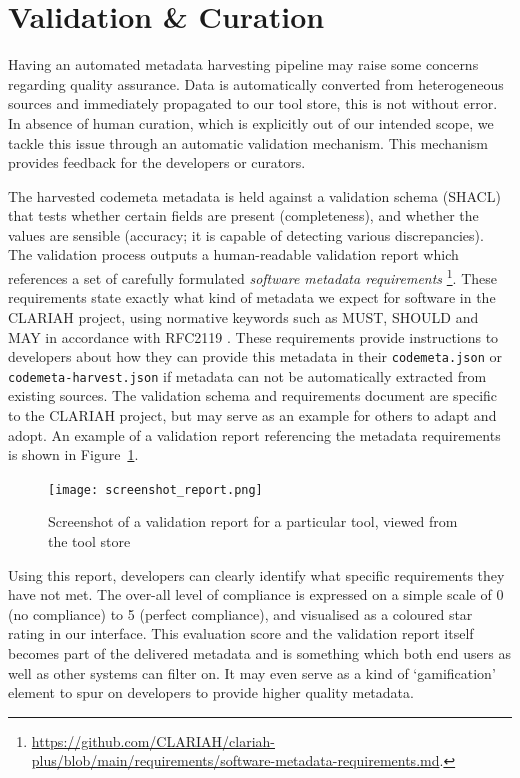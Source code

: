 \documentclass[a4paper,11pt]{article}
\begin{document}

\section{Validation \& Curation}

Having an automated metadata harvesting pipeline may raise some concerns
regarding quality assurance. Data is automatically converted from heterogeneous
sources and immediately propagated to our tool store, this is not without
error. In absence of human curation, which is explicitly out of our intended
scope, we tackle this issue through an automatic validation mechanism. This mechanism provides
feedback for the developers or curators.

The harvested codemeta metadata is held against a validation schema (SHACL)
that tests whether certain fields are present (completeness), and whether the
values are sensible (accuracy; it is capable of detecting various
discrepancies). The validation process outputs a human-readable validation
report which references a set of carefully formulated \emph{software metadata
requirements}
\footnote{\url{https://github.com/CLARIAH/clariah-plus/blob/main/requirements/software-metadata-requirements.md}.}.
These requirements state exactly what kind of metadata we expect for software
in the CLARIAH project, using normative keywords such as \textsc{MUST}, \textsc{SHOULD} and \textsc{MAY}
in accordance with RFC2119 \citep{RFC2119}. These requirements provide
instructions to developers about how they can provide this metadata in
their \texttt{codemeta.json} or \texttt{codemeta-harvest.json} if metadata can not be
automatically extracted from existing sources. The validation schema and
requirements document are specific to the CLARIAH project, but may serve as an
example for others to adapt and adopt. An example of a validation report
referencing the metadata requirements is shown in
Figure~\ref{fig:validationreport}.

\begin{figure}[h]
\begin{center}
\texttt{[image: screenshot\_report.png]}
\caption{Screenshot of a validation report for a particular tool, viewed from the tool store}
\label{fig:validationreport}
\end{center}
\end{figure}

Using this report, developers can clearly identify what specific requirements
they have not met. The over-all level of compliance is expressed on a simple
scale of 0 (no compliance) to 5 (perfect compliance), and visualised as a
coloured star rating in our interface. This evaluation score and the validation
report itself becomes part of the delivered metadata and is something which
both end users as well as other systems can filter on. It may even serve as a
kind of `gamification' element to spur on developers to provide higher quality
metadata.
\end{document}
